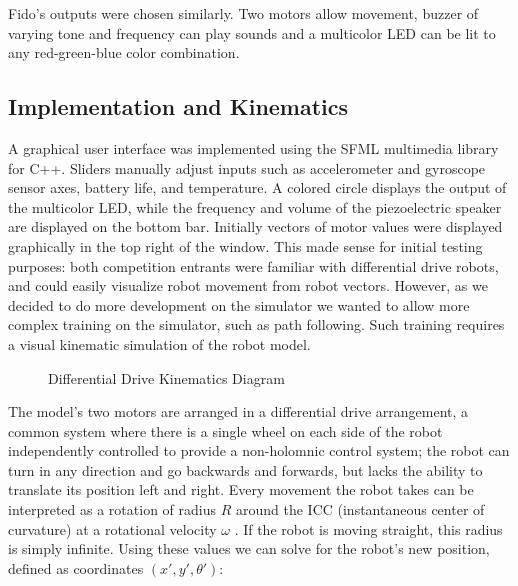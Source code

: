 Fido's outputs were chosen similarly.  Two motors allow movement, buzzer of varying tone and frequency can play sounds and a multicolor LED can be lit to any red-green-blue color combination.

\subsection{Implementation and Kinematics}

A graphical user interface was implemented using the SFML multimedia library for C++.  Sliders manually adjust inputs such as accelerometer and gyroscope sensor axes, battery life, and temperature.  A colored circle displays the output of the multicolor LED, while the frequency and volume of the piezoelectric speaker are displayed on the bottom bar.   Initially vectors of motor values were displayed graphically in the top right of the window.  This made sense for initial testing purposes: both competition entrants were familiar with differential drive robots, and could easily visualize robot movement from robot vectors.  However, as we decided to do more development on the simulator we wanted to allow more complex training on the simulator, such as path following.  Such training requires a visual kinematic simulation of the robot model.

\begin{figure}[ht]
	\centering
	
	\caption{Differential Drive Kinematics Diagram}
\end{figure}

The model's two motors are arranged in a differential drive arrangement, a common system where there is a single wheel on each side of the robot independently controlled to provide a non-holomnic control system; the robot can turn in any direction and go backwards and forwards, but lacks the ability to translate its position left and right.  Every movement the robot takes can be interpreted as a rotation of radius $R$ around the ICC (instantaneous center of curvature) at a rotational velocity $\omega$ \cite{dudek}.   If the robot is moving straight, this radius is simply infinite.  Using these values we can solve for the robot's new position, defined as coordinates $(x',y',\theta')$:

